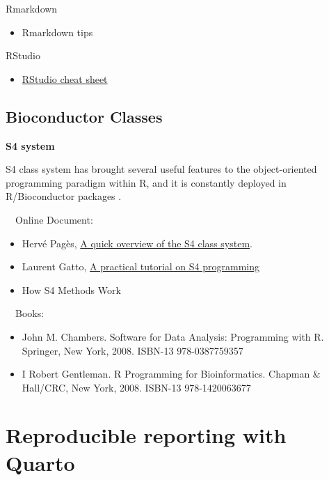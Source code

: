 \documentclass[
]{book}
\providecommand{\tightlist}{%
  \setlength{\itemsep}{0pt}\setlength{\parskip}{0pt}}
\begin{document}
Rmarkdown

\begin{itemize}
\tightlist
\item
  Rmarkdown tips \citep{Xie2020}
\end{itemize}

RStudio

\begin{itemize}
\tightlist
\item
  \href{https://www.rstudio.com/wp-content/uploads/2016/01/rstudio-IDE-cheatsheet.pdf}{RStudio cheat sheet}
\end{itemize}

\hypertarget{bioc_intro}{%
\subsection{Bioconductor Classes}\label{bioc_intro}}

\textbf{S4 system}

S4 class system has brought several useful features to the
object-oriented programming paradigm within R, and it is constantly
deployed in R/Bioconductor packages \citep{Huber2015}.

~~Online Document:

\begin{itemize}
\tightlist
\item
  Hervé Pagès, \href{https://bioconductor.org/packages/release/bioc/vignettes/S4Vectors/inst/doc/S4QuickOverview.pdf}{A quick overview of the S4 class system}.
\item
  Laurent Gatto, \href{https://bioconductor.org/help/course-materials/2013/CSAMA2013/friday/afternoon/S4-tutorial.pdf}{A practical tutorial on S4 programming}
\item
  How S4 Methods Work \citep{Chambers2006}
\end{itemize}

~~Books:

\begin{itemize}
\tightlist
\item
  John M. Chambers. Software for Data Analysis: Programming with R. Springer, New York, 2008. ISBN-13 978-0387759357 \citep{Chambers2008}
\item
  I Robert Gentleman. R Programming for Bioinformatics. Chapman \& Hall/CRC, New York, 2008. ISBN-13 978-1420063677 \citep{gentleman2008r}
\end{itemize}

\hypertarget{quarto}{%
\section{Reproducible reporting with Quarto}\label{quarto}}
\end{document}
